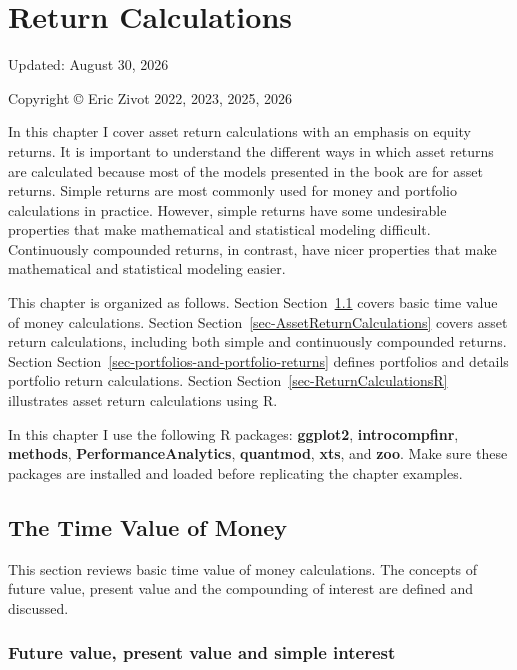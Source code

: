 \documentclass[
  letterpaper,
  DIV=11,
  numbers=noendperiod]{scrreprt}
\theoremstyle{definition}
\theoremstyle{definition}
\theoremstyle{remark}
\begin{document}

\hypertarget{Return-Calculations}{%
\chapter{Return Calculations}\label{Return-Calculations}}

Updated: August 30, 2026

Copyright © Eric Zivot 2022, 2023, 2025, 2026

In this chapter I cover asset return calculations with an emphasis on
equity returns. It is important to understand the different ways in
which asset returns are calculated because most of the models presented
in the book are for asset returns. Simple returns are most commonly used
for money and portfolio calculations in practice. However, simple
returns have some undesirable properties that make mathematical and
statistical modeling difficult. Continuously compounded returns, in
contrast, have nicer properties that make mathematical and statistical
modeling easier.

This chapter is organized as follows. Section
Section~\ref{sec-TimeValueMoney} covers basic time value of money
calculations. Section Section~\ref{sec-AssetReturnCalculations} covers
asset return calculations, including both simple and continuously
compounded returns. Section
Section~\ref{sec-portfolios-and-portfolio-returns} defines portfolios
and details portfolio return calculations. Section
Section~\ref{sec-ReturnCalculationsR} illustrates asset return
calculations using R.

In this chapter I use the following R packages: \textbf{ggplot2},
\textbf{introcompfinr}, \textbf{methods}, \textbf{PerformanceAnalytics},
\textbf{quantmod}, \textbf{xts}, and \textbf{zoo}. Make sure these
packages are installed and loaded before replicating the chapter
examples.

\hypertarget{sec-TimeValueMoney}{%
\section{The Time Value of Money}\label{sec-TimeValueMoney}}

This section reviews basic time value of money calculations. The
concepts of future value, present value and the compounding of interest
are defined and discussed.

\hypertarget{future-value-present-value-and-simple-interest}{%
\subsection{Future value, present value and simple
interest}\label{future-value-present-value-and-simple-interest}}
\end{document}
